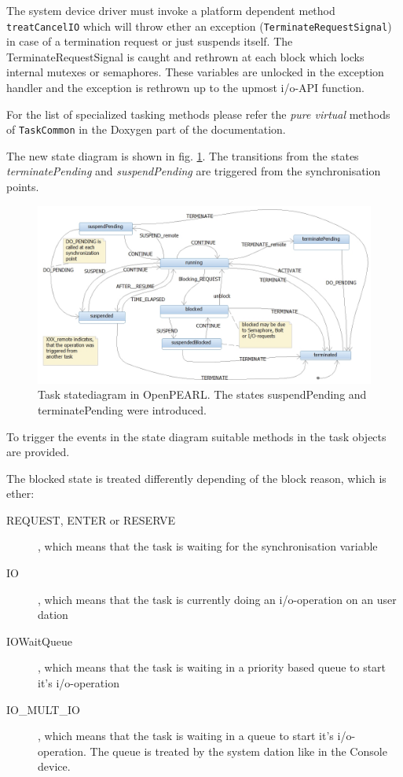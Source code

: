 The system device driver must invoke a platform dependent method
\verb|treatCancelIO| which will throw ether an exception
(\verb|TerminateRequestSignal|) in case of a termination request
 or just suspends itself.
The TerminateRequestSignal is caught and rethrown at each block which 
locks internal mutexes or semaphores. These variables are unlocked in
the exception handler and the exception is rethrown up to the upmost i/o-API
function.

For the list of specialized tasking methods please refer the
{\em pure virtual} methods of \verb|TaskCommon| in the Doxygen
part of the documentation.

The new state diagram is shown in 
fig. \ref{taskStatesOpenPEARL}.
The transitions from the  states {\em terminatePending} and 
{\em suspendPending}  are triggered from the synchronisation points.

\begin{figure}[bpht]
\includegraphics[width=14cm]{taskStatesOpenPEARL.jpg}
\caption{Task statediagram in OpenPEARL.
The states suspendPending and terminatePending were introduced.}
\label{taskStatesOpenPEARL}
\end{figure}
To trigger the events in the state diagram suitable methods in the task 
objects are provided. 

The blocked state is treated differently depending of the block reason, which
is ether:
\begin{description}
\item[REQUEST, ENTER or RESERVE], which means that the task is waiting for 
   the synchronisation variable
\item[IO], which means that the task is currently doing an i/o-operation
   on an user dation
\item[IOWaitQueue], which means that the task is waiting in a priority based
   queue to start it's i/o-operation
\item[IO\_MULT\_IO], which means that the task is waiting in a 
   queue to start it's i/o-operation. The queue is treated by the 
   system dation like in the Console device.
\end{description}

